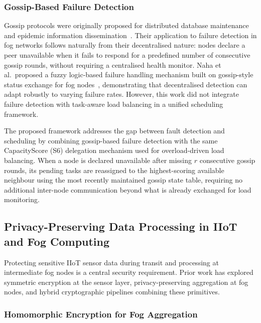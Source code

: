 \documentclass[conference]{IEEEtran}
\begin{document}
\subsubsection{Gossip-Based Failure Detection}

Gossip protocols were originally proposed for distributed database maintenance and epidemic information dissemination~\cite{demers1988epidemic}. Their application to failure detection in fog networks follows naturally from their decentralised nature: nodes declare a peer unavailable when it fails to respond for a predefined number of consecutive gossip rounds, without requiring a centralised health monitor. Naha et al.\ proposed a fuzzy logic-based failure handling mechanism built on gossip-style status exchange for fog nodes~\cite{naha2021}, demonstrating that decentralised detection can adapt robustly to varying failure rates. However, this work did not integrate failure detection with task-aware load balancing in a unified scheduling framework.

The proposed framework addresses the gap between fault detection and scheduling by combining gossip-based failure detection with the same CapacityScore (S6) delegation mechanism used for overload-driven load balancing. When a node is declared unavailable after missing $r$ consecutive gossip rounds, its pending tasks are reassigned to the highest-scoring available neighbour using the most recently maintained gossip state table, requiring no additional inter-node communication beyond what is already exchanged for load monitoring.

\subsection{Privacy-Preserving Data Processing in IIoT and Fog Computing}

Protecting sensitive IIoT sensor data during transit and processing at intermediate fog nodes is a central security requirement. Prior work has explored symmetric encryption at the sensor layer, privacy-preserving aggregation at fog nodes, and hybrid cryptographic pipelines combining these primitives.

\subsubsection{Homomorphic Encryption for Fog Aggregation}
\end{document}
